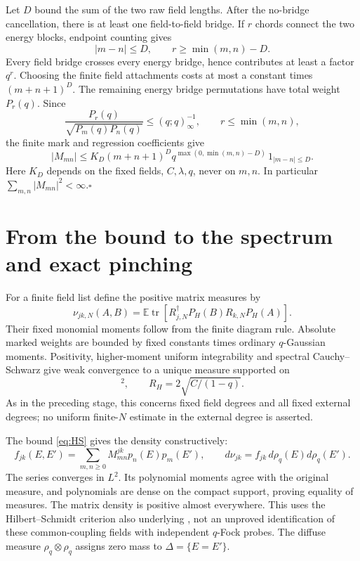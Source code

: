 \documentclass[11pt]{article}
\newcommand{\EE}{\mathbb E}
\newcommand{\tr}{\operatorname{tr}}
\begin{document}
Let $D$ bound the sum of the two raw field lengths. After the
no-bridge cancellation, there is at least one field-to-field bridge.
If $r$ chords connect the two energy blocks, endpoint counting gives
\begin{equation}
 |m-n|\le D,\qquad r\ge\min(m,n)-D.
\end{equation}
Every field bridge crosses every energy bridge, hence contributes
at least a factor $q^r$. Choosing the finite field attachments
costs at most a constant times $(m+n+1)^D$. The remaining energy
bridge permutations have total weight $P_r(q)$. Since
\begin{equation}
 \frac{P_r(q)}{\sqrt{P_m(q)P_n(q)}}\le(q;q)_\infty^{-1},
 \qquad r\le\min(m,n),
\end{equation}
the finite mark and regression coefficients give
\begin{equation}
 \boxed{|M_{mn}|\le K_D(m+n+1)^D
 q^{\max(0,\min(m,n)-D)}\,1_{|m-n|\le D}.}\label{eq:HS}
\end{equation}
Here $K_D$ depends on the fixed fields, $C,\lambda,q$, never on
$m,n$. In particular $\sum_{m,n}|M_{mn}|^2<\infty$.\hfill$\square$

\newpage
\section{From the bound to the spectrum and exact pinching}
For a finite field list define the positive matrix measures by
\begin{equation}
 \nu_{jk,N}(A,B)=\EE\tr[R_{j,N}^\dagger P_H(B)R_{k,N}P_H(A)].
 \label{eq:measure}
\end{equation}
Their fixed monomial moments follow from the finite diagram rule.
Absolute marked weights are bounded by fixed constants times
ordinary $q$-Gaussian moments. Positivity, higher-moment uniform
integrability and spectral Cauchy--Schwarz give weak convergence
to a unique measure supported on
\begin{equation}
 [-R_H,R_H]^2,\qquad R_H=2\sqrt{C/(1-q)}.
\end{equation}
As in the preceding stage, this concerns fixed field degrees and
all fixed external degrees; no uniform finite-$N$ estimate in the
external degree is asserted.

The bound \eqref{eq:HS} gives the density constructively:
\begin{equation}
 f_{jk}(E,E')=\sum_{m,n\ge0}M^{jk}_{mn}p_n(E)p_m(E'),
 \qquad d\nu_{jk}=f_{jk}\,d\rho_q(E)d\rho_q(E').\label{eq:density}
\end{equation}
The series converges in $L^2$. Its polynomial moments agree with
the original measure, and polynomials are dense on the compact
support, proving equality of measures. The matrix density is
positive almost everywhere. This uses the Hilbert--Schmidt
criterion also underlying \cite{BM}, not an unproved identification
of these common-coupling fields with independent $q$-Fock probes.
The diffuse measure $\rho_q\otimes\rho_q$ assigns zero mass to
$\Delta=\{E=E'\}$.
\end{document}

